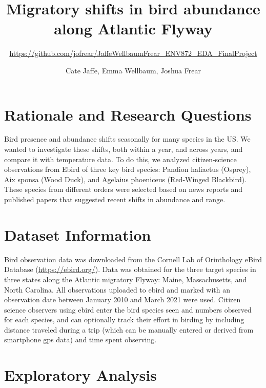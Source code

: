 \documentclass[
  12pt,
]{article}
\title{Migratory shifts in bird abundance along Atlantic Flyway}
\subtitle{\url{https://github.com/jofrear/JaffeWellbaumFrear_ENV872_EDA_FinalProject}}
\author{Cate Jaffe, Emma Wellbaum, Joshua Frear}
\date{}
\begin{document}
\maketitle

\newpage
\tableofcontents 
\newpage
\listoftables 
\newpage
\listoffigures 
\newpage

\hypertarget{rationale-and-research-questions}{%
\section{Rationale and Research
Questions}\label{rationale-and-research-questions}}

Bird presence and abundance shifts seasonally for many species in the
US. We wanted to investigate these shifts, both within a year, and
across years, and compare it with temperature data. To do this, we
analyzed citizen-science observations from Ebird of three key bird
species: Pandion haliaetus (Osprey), Aix sponsa (Wood Duck), and
Agelaius phoeniceus (Red-Winged Blackbird). These species from different
orders were selected based on news reports and published papers that
suggested recent shifts in abundance and range.

\newpage

\hypertarget{dataset-information}{%
\section{Dataset Information}\label{dataset-information}}

Bird observation data was downloaded from the Cornell Lab of Orinthology
eBird Database (\url{https://ebird.org/}). Data was obtained for the
three target species in three states along the Atlantic migratory
Flyway: Maine, Massachusetts, and North Carolina. All observations
uploaded to ebird and marked with an observation date between January
2010 and March 2021 were used. Citizen science observers using ebird
enter the bird species seen and numbers observed for each species, and
can optionally track their effort in birding by including distance
traveled during a trip (which can be manually entered or derived from
smartphone gps data) and time spent observing.

\newpage

\hypertarget{exploratory-analysis}{%
\section{Exploratory Analysis}\label{exploratory-analysis}}
\end{document}
